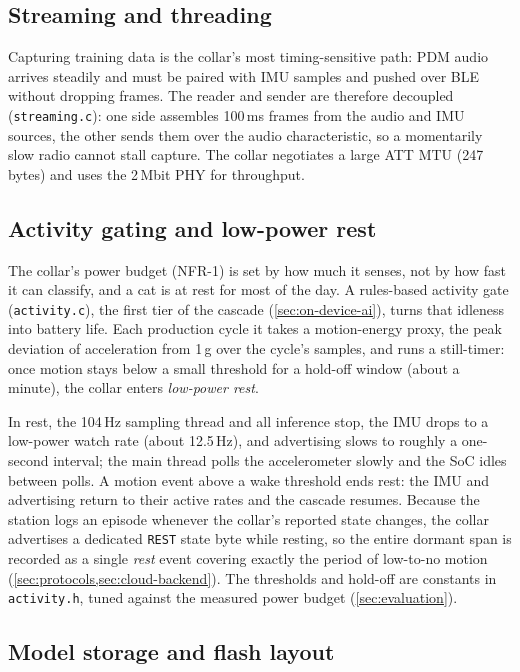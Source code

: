 \subsection{Streaming and threading}

Capturing training data is the collar's most timing-sensitive path: PDM audio arrives steadily and
must be paired with IMU samples and pushed over BLE without dropping frames. The reader and sender
are therefore decoupled (\texttt{streaming.c}): one side assembles 100\,ms frames from the audio and
IMU sources, the other sends them over the audio characteristic, so a momentarily slow radio cannot
stall capture. The collar negotiates a large ATT MTU (247 bytes) and uses the 2\,Mbit PHY for
throughput.

\subsection{Activity gating and low-power rest}

The collar's power budget (NFR-1) is set by how much it senses, not by how fast it can classify, and a
cat is at rest for most of the day. A rules-based activity gate (\texttt{activity.c}), the first tier
of the cascade (\cref{sec:on-device-ai}), turns that idleness into battery life. Each production cycle
it takes a motion-energy proxy, the peak deviation of acceleration from 1\,g over the cycle's samples,
and runs a still-timer: once motion stays below a small threshold for a hold-off window (about a
minute), the collar enters \emph{low-power rest}.

In rest, the 104\,Hz sampling thread and all inference stop, the IMU drops to a low-power watch rate
(about 12.5\,Hz), and advertising slows to roughly a one-second interval; the main thread polls the
accelerometer slowly and the SoC idles between polls. A motion event above a wake threshold ends rest:
the IMU and advertising return to their active rates and the cascade resumes. Because the station logs
an episode whenever the collar's reported state changes, the collar advertises a dedicated
\texttt{REST} state byte while resting, so the entire dormant span is recorded as a single
\emph{rest} event covering exactly the period of low-to-no motion
(\cref{sec:protocols,sec:cloud-backend}). The thresholds and hold-off are constants in
\texttt{activity.h}, tuned against the measured power budget (\cref{sec:evaluation}).

\subsection{Model storage and flash layout}

